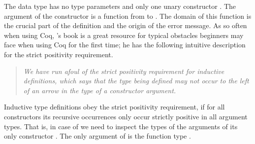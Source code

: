 The data type  has no type parameters and only
one unary constructor .
The argument of the constructor  is a function from
 to .
The domain of this function is the crucial part of the definition and
the origin of the error message.
As so often when using Coq, \citeauthor{chlipala2011certified}'s book is a
great resource for typical obstacles beginners may face when using Coq
for the first time; he has the following intuitive description for the
strict positivity requirement.

\begin{quote}
\emph{We have run afoul of the strict positivity requirement for
  inductive definitions, which says that the type being defined may
  not occur to the left of an arrow in the type of a constructor
  argument.}
\end{quote}

Inductive type definitions obey the strict positivity requirement, if
for all constructors its recursive occurrences only occur strictly
positive in all argument types.
That is, in case of  we need to inspect the types
of the arguments of its only constructor .
The only argument of  is the function type
.

